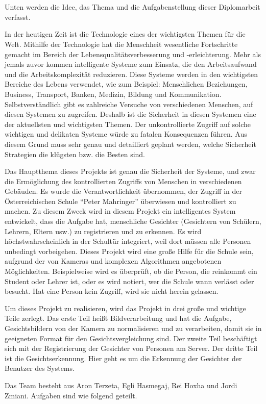 \chapter{\docname}
\label{\docname}

\color{black}
Unten werden die Idee, das Thema und die Aufgabenstellung dieser Diplomarbeit verfasst.
\begin{flushleft}
	In der heutigen Zeit ist die Technologie eines der wichtigsten Themen für die Welt. Mithilfe der Technologie hat die Menschheit wesentliche Fortschritte gemacht im Bereich der Lebensqualitätsverbesserung und -erleichterung. Mehr als jemals zuvor kommen intelligente Systeme zum Einsatz, die den Arbeitsaufwand und die Arbeitskomplexität reduzieren. Diese Systeme werden in den wichtigsten Bereiche des Lebens verwendet, wie zum Beispiel: Menschlichen Beziehungen, Business, Transport, Banken, Medizin, Bildung und Kommunikation. Selbstverständlich gibt es zahlreiche Versuche von verschiedenen Menschen, auf diesen Systemen zu zugreifen. Deshalb ist die Sicherheit in diesen Systemen eine der aktuellsten und wichtigsten Themen. Der unkontrollierte Zugriff auf solche wichtigen und delikaten Systeme würde zu fatalen Konsequenzen führen. Aus diesem Grund muss sehr genau und detailliert geplant werden, welche Sicherheit Strategien die klügsten bzw. die Besten sind.   
	
	Das Hauptthema dieses Projekts ist genau die Sicherheit der Systeme, und zwar die Ermöglichung des kontrollierten Zugriffs von Menschen in verschiedenen Gebäuden. Es wurde die Verantwortlichkeit übernommen, der Zugriff in der Österreichischen Schule “Peter Mahringer” überwiesen und kontrolliert zu machen. Zu diesem Zweck wird in diesem Projekt ein intelligentes System entwickelt, dass die Aufgabe hat, menschliche Gesichter (Gesichtern von Schülern, Lehrern, Eltern usw.) zu registrieren und zu erkennen. Es wird höchstwahrscheinlich in der Schultür integriert, weil dort müssen alle Personen unbedingt vorbeigehen. Dieses Projekt wird eine große Hilfe für die Schule sein, aufgrund der von Kameras und komplexen Algorithmen angebotenen Möglichkeiten. Beispielweise wird es überprüft, ob die Person, die reinkommt ein Student oder Lehrer ist, oder es wird notiert, wer die Schule wann verlässt oder besucht. Hat eine Person kein Zugriff, wird sie nicht herein gelassen.
	
	Um dieses Projekt zu realisieren, wird das Projekt in drei große und wichtige Teile zerlegt. Das erste Teil heißt Bildverarbeitung und hat die Aufgabe, Gesichtsbildern von der Kamera zu normalisieren und zu verarbeiten, damit sie in geeigneten Format für den Gesichtsvergleichung sind. Der zweite Teil beschäftigt sich mit der Registrierung der Gesichter von Personen am Server. Der dritte Teil ist die Gesichtserkennung. Hier geht es um die Erkennung der Gesichter der Benutzer des Systems. 

	
	Das Team besteht aus Aron Terzeta, Egli Hasmegaj, Rei Hoxha und Jordi Zmiani. 
	Aufgaben sind wie folgend geteilt. 
\end{flushleft}
